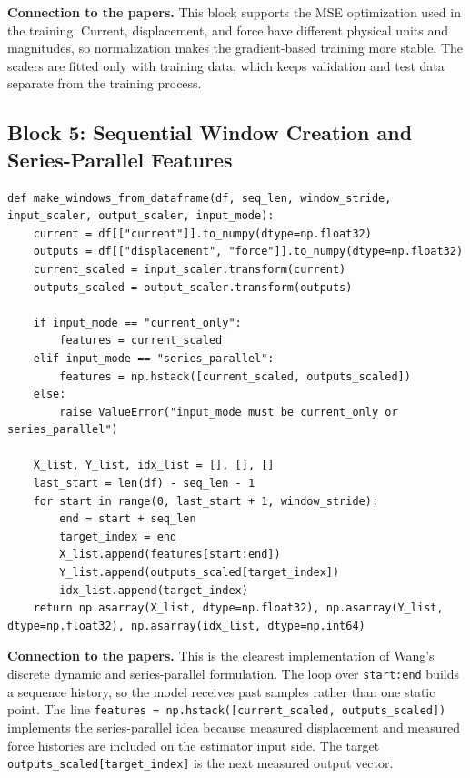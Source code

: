 \documentclass[11pt]{article}
\begin{document}
\noindent\textbf{Connection to the papers.}
This block supports the MSE optimization used in the training. Current, displacement, and force have different physical units and magnitudes, so normalization makes the gradient-based training more stable. The scalers are fitted only with training data, which keeps validation and test data separate from the training process.

\subsection{Block 5: Sequential Window Creation and Series-Parallel Features}
\begin{lstlisting}[style=pythonstyle]
def make_windows_from_dataframe(df, seq_len, window_stride, input_scaler, output_scaler, input_mode):
    current = df[["current"]].to_numpy(dtype=np.float32)
    outputs = df[["displacement", "force"]].to_numpy(dtype=np.float32)
    current_scaled = input_scaler.transform(current)
    outputs_scaled = output_scaler.transform(outputs)

    if input_mode == "current_only":
        features = current_scaled
    elif input_mode == "series_parallel":
        features = np.hstack([current_scaled, outputs_scaled])
    else:
        raise ValueError("input_mode must be current_only or series_parallel")

    X_list, Y_list, idx_list = [], [], []
    last_start = len(df) - seq_len - 1
    for start in range(0, last_start + 1, window_stride):
        end = start + seq_len
        target_index = end
        X_list.append(features[start:end])
        Y_list.append(outputs_scaled[target_index])
        idx_list.append(target_index)
    return np.asarray(X_list, dtype=np.float32), np.asarray(Y_list, dtype=np.float32), np.asarray(idx_list, dtype=np.int64)
\end{lstlisting}

\noindent\textbf{Connection to the papers.}
This is the clearest implementation of Wang's discrete dynamic and series-parallel formulation. The loop over \texttt{start:end} builds a sequence history, so the model receives past samples rather than one static point. The line \texttt{features = np.hstack([current\_scaled, outputs\_scaled])} implements the series-parallel idea because measured displacement and measured force histories are included on the estimator input side. The target \texttt{outputs\_scaled[target\_index]} is the next measured output vector.
\end{document}
